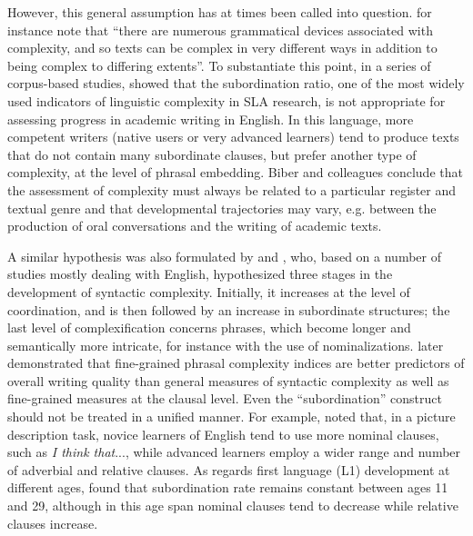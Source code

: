 \documentclass[output=paper]{langscibook}
\begin{document}
However, this general assumption has at times been called into question. \citet[648]{BiberEtAl2016} for instance note that “there are numerous grammatical devices associated with complexity, and so texts can be complex in very different ways in addition to being complex to differing extents”. To substantiate this point, in a series of corpus-based studies, \citet{BiberEtAl2011, BiberEtAl2016, BiberEtAl2020} showed that the subordination ratio, one of the most widely used indicators of linguistic complexity in SLA research, is not appropriate for assessing progress in academic writing in English. In this language, more competent writers (native users or very advanced learners) tend to produce texts that do not contain many subordinate clauses, but prefer another type of complexity, at the level of phrasal embedding. Biber and colleagues conclude that the assessment of complexity must always be related to a particular register and textual genre and that developmental trajectories may vary, e.g. between the production of oral conversations and the writing of academic texts. 

A similar hypothesis was also formulated by \citet{Ortega2003, Ortega2012} and \citet{NorrisOrtega2009}, who, based on a number of studies mostly dealing with English, hypothesized three stages in the development of syntactic complexity. Initially, it increases at the level of coordination, and is then followed by an increase in subordinate structures; the last level of complexification concerns phrases, which become longer and semantically more intricate, for instance with the use of nominalizations. \citet{KyleCrossley2018} later demonstrated that fine-grained phrasal complexity indices are better predictors of overall writing quality than general measures of syntactic complexity as well as fine-grained measures at the clausal level. Even the “subordination” construct should not be treated in a unified manner. For example, \citet{LambertNakamura2019} noted that, in a picture description task, novice learners of English tend to use more nominal clauses, such as \textit{I think that}..., while advanced learners employ a wider range and number of adverbial and relative clauses. As regards first language (L1) development at different ages, \citet{NippoldEtAl2005} found that subordination rate remains constant between ages 11 and 29, although in this age span nominal clauses tend to decrease while relative clauses increase. 
\end{document}
